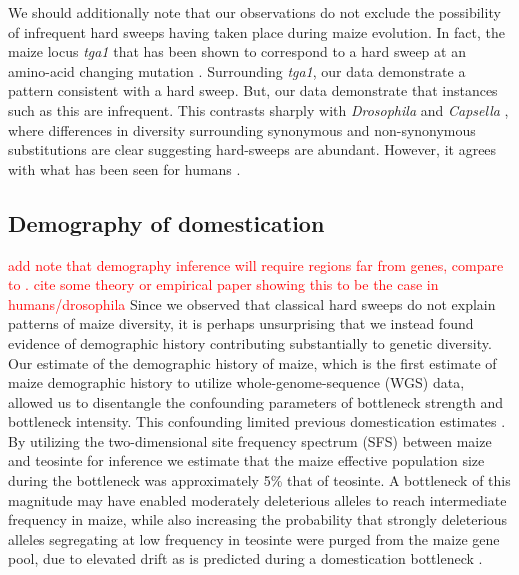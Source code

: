 \documentclass{pnastwo}
\newcommand{\jri}[1]{\textcolor{red}{\scriptsize #1}}
\begin{document}
\begin{article}
We should additionally note that our observations do not exclude the possibility of infrequent hard sweeps having taken place during maize evolution. In fact, the maize locus \emph{tga1} that has been shown to correspond to a hard sweep at an amino-acid changing mutation \cite{wang2015}. Surrounding \emph{tga1},  our data demonstrate a pattern consistent with a hard sweep. But, our data demonstrate that instances such as this are infrequent. This contrasts sharply with \emph{Drosophila} \cite{sattath2011} and \emph{Capsella} \cite{williamson2014}, where differences in diversity surrounding synonymous and non-synonymous substitutions are clear suggesting hard-sweeps are abundant. However, it agrees with what has been seen for humans \cite{hernandez2011}. 

\subsection{Demography of domestication}
\jri{add note that demography inference will require regions far from genes, compare to \cite{wright2005,wang1999,eyre1998}. cite some theory or empirical paper showing this to be the case in humans/drosophila}
Since we observed that classical hard sweeps do not explain patterns of maize diversity, it is perhaps unsurprising that we instead found evidence of demographic history contributing substantially to genetic diversity. Our estimate of the demographic history of maize, which is the first estimate of maize demographic history to utilize whole-genome-sequence (WGS) data, allowed us to disentangle the confounding parameters of bottleneck strength and bottleneck intensity. This confounding limited previous domestication estimates \cite{wright2005}. By utilizing the two-dimensional site frequency spectrum (SFS) between maize and teosinte for inference \cite{gutenkunst2009} we estimate that the maize effective population size during the bottleneck was approximately 5\% that of teosinte. A bottleneck of this magnitude may have enabled moderately deleterious alleles to reach intermediate frequency in maize, while also increasing the probability that strongly deleterious alleles segregating at low frequency in teosinte were purged from the maize gene pool, due to elevated drift as is predicted during a domestication bottleneck \cite{tajima1989}.


\end{article}
\end{document}
